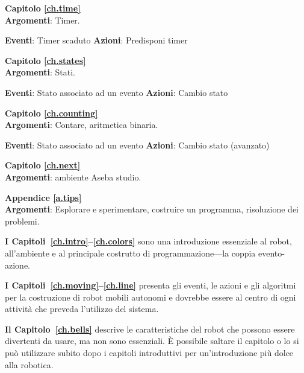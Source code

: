 {\centering \textbf{Capitolo \ref{ch.time}}\\}
\textbf{Argomenti}: Timer.

\textbf{Eventi}: Timer scaduto \hfill \textbf{Azioni}: Predisponi timer

 \hfill {}

\bigskip

{\centering \textbf{Capitolo \ref{ch.states}}\\}
\textbf{Argomenti}: Stati.

\textbf{Eventi}: Stato associato ad un evento \hfill \textbf{Azioni}: Cambio stato

 \hfill {}

\bigskip

{\centering \textbf{Capitolo \ref{ch.counting}}\\}
\textbf{Argomenti}: Contare, aritmetica binaria.

\textbf{Eventi}: Stato associato ad un evento  \hfill \textbf{Azioni}: Cambio stato (avanzato)

 \hfill {}

\bigskip

{\centering \textbf{Capitolo \ref{ch.next}}\\}
\textbf{Argomenti}: ambiente Aseba studio.

\bigskip

{\centering \textbf{Appendice \ref{a.tips}}\\}
\textbf{Argomenti}: Esplorare e sperimentare,
costruire un programma, risoluzione dei problemi.



\textbf{I Capitoli~\ref{ch.intro}--\ref{ch.colors}} sono una introduzione essenziale
al robot, all'ambiente e al principale costrutto di programmazione---la
coppia evento-azione.

\textbf{I Capitoli~\ref{ch.moving}--\ref{ch.line}} presenta gli eventi, le azioni e gli algoritmi
per la costruzione di robot mobili autonomi e dovrebbe essere al centro di ogni
attività che preveda l'utilizzo del sistema.

\textbf{Il Capitolo~\ref{ch.bells}} descrive le caratteristiche del robot che possono
essere divertenti da usare, ma non sono essenziali. È possibile saltare il capitolo o lo si può
utilizzare subito dopo i capitoli introduttivi
per un'introduzione più dolce alla robotica.

